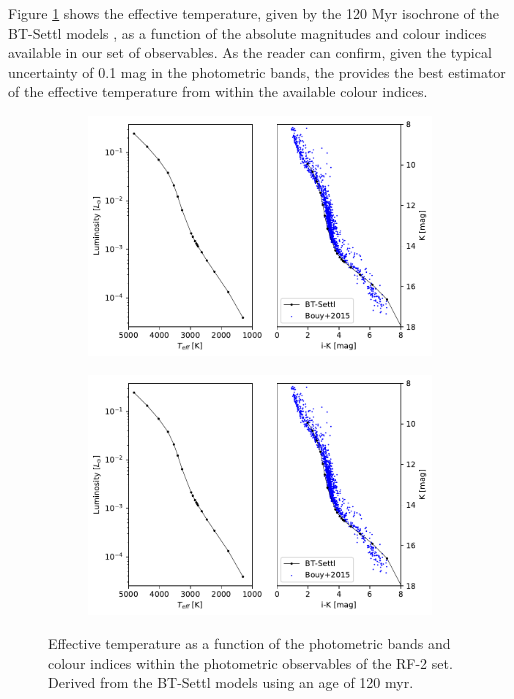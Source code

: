 Figure \ref{fig:Teff_vs_colours} shows the effective temperature, given by the 120 Myr isochrone of the BT-Settl models \citep{2014IAUS..299..271A}, as a function of the absolute magnitudes and colour indices available in our set of observables. 
As the reader can confirm, given the typical uncertainty of 0.1 mag in the photometric bands, the  provides the best estimator of the effective temperature from within the available colour indices. 


\begin{figure}[htp!]
\begin{center} 
\begin{subfigure}[t]{0.48\textwidth}
\includegraphics[page=2,width=\textwidth]{background/Figures/Teff_vs_phot.pdf}
\end{subfigure}
 \begin{subfigure}[t]{0.48\textwidth}
\includegraphics[page=3,width=\textwidth]{background/Figures/Teff_vs_phot.pdf}
\end{subfigure}
\caption{Effective temperature as a function of the photometric bands and colour indices within the photometric observables of the RF-2 set. Derived from the BT-Settl models \citep{2014IAUS..299..271A} using an age of 120 \gls{myr}.}
\label{fig:Teff_vs_colours}
\end{center}
\end{figure}



